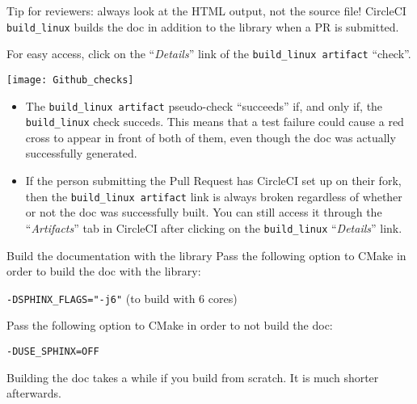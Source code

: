 \documentclass[8pt]{beamer}
\begin{document}
\begin{frame}{Tip for reviewers: always look at the HTML output, not the source file!}
CircleCI \texttt{build\_linux} builds the doc in addition to the library when a PR is submitted.

For easy access, click on the ``\alert{\emph{Details}}'' link of the \texttt{build\_linux artifact} ``check''.

\texttt{[image: Github\_checks]}

\begin{itemize}
    \item The \texttt{build\_linux artifact} pseudo-check ``succeeds'' if, and only if, the \texttt{build\_linux} check succeds.
    This means that a test failure could cause a red cross to appear in front of both of them, even though the doc was actually successfully generated.
    \item If the person submitting the Pull Request has CircleCI set up on their fork, then the \texttt{build\_linux artifact} link is always broken regardless of whether or not the doc was successfully built. You can still access it through the ``\alert{\emph{Artifacts}}'' tab in CircleCI after clicking on the \texttt{build\_linux} ``\alert{\emph{Details}}'' link.
\end{itemize}
\end{frame}


\begin{frame}{Build the documentation with the library}
    Pass the following option to \alert{CMake} in order to build the doc with the library:
    
    \texttt{-DSPHINX\_FLAGS="-j6"} (to build with 6 cores)

    Pass the following option to \alert{CMake} in order to \alert{not} build the doc:
    
    \texttt{-DUSE\_SPHINX=OFF}

    Building the doc takes a while if you build from scratch. It is much shorter afterwards.
\end{frame}


\end{document}
